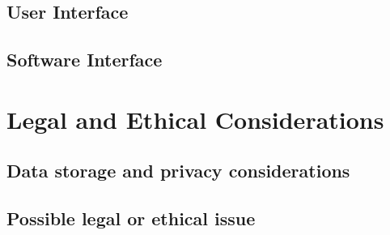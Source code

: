 \documentclass{article}
\begin{document}
\subsection{User Interface}

\subsection{Software Interface}


\section{Legal and Ethical Considerations}
\subsection{Data storage and privacy considerations}

\subsection{Possible legal or ethical issue}

\printglossaries
\end{document}
